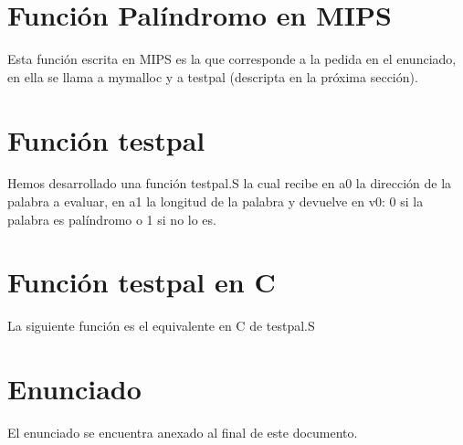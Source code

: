 \documentclass[11pt,a4paper]{article}
\begin{document}


\section{Función Palíndromo en MIPS}
Esta función escrita en MIPS es la que corresponde a la pedida en el enunciado, en ella se llama a mymalloc y a testpal (descripta en la próxima sección).



\section{Función testpal}
Hemos desarrollado una función testpal.S la cual recibe en a0 la dirección de la palabra a evaluar, en a1 la longitud de la palabra y devuelve en v0: 0 si la palabra es palíndromo o 1 si no lo es.



\section{Función testpal en C}
La siguiente función es el equivalente en C de testpal.S



\section{Enunciado}
El enunciado se encuentra anexado al final de este documento.
\end{document}
